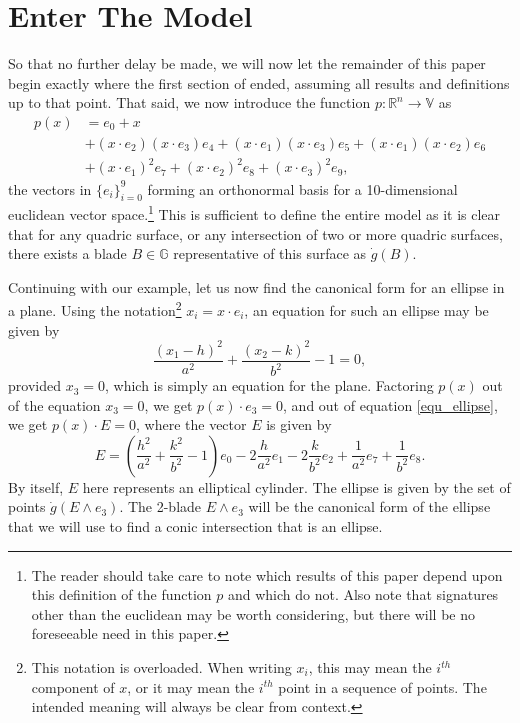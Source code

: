 \documentclass{birkjour}
\theoremstyle{definition}
\theoremstyle{remark}
\numberwithin{equation}{section}
\newcommand{\R}{\mathbb{R}}
\newcommand{\G}{\mathbb{G}}
\newcommand{\V}{\mathbb{V}}
\newcommand{\gd}{\dot{g}}
\begin{document}
\section{Enter The Model}

So that no further delay be made, we will now let the remainder of this paper begin
exactly where the first section of \cite{} ended, assuming all results and definitions up to that point.
That said, we now introduce the function $p:\R^n\to\V$ as
\begin{align*}
p(x) &= e_0 + x \\
 &+ (x\cdot e_2)(x\cdot e_3)e_4 + (x\cdot e_1)(x\cdot e_3)e_5 + (x\cdot e_1)(x\cdot e_2)e_6 \\
 &+ (x\cdot e_1)^2e_7 + (x\cdot e_2)^2e_8 + (x\cdot e_3)^2 e_9,
\end{align*}
the vectors in $\{e_i\}_{i=0}^9$ forming an orthonormal basis for a 10-dimensional
euclidean vector space.\footnote{The reader should take care to note which results of this paper
depend upon this definition of the function $p$ and which do not.  Also note that signatures
other than the euclidean may be worth considering, but there will be no foreseeable need in this paper.}
This is sufficient to define the entire model as it is clear that for any quadric
surface, or any intersection of two or more quadric surfaces, there exists a blade
$B\in\G$ representative of this surface as $\gd(B)$.

Continuing with our example, let us now find the canonical form for an ellipse
in a plane.  Using the notation\footnote{This notation is overloaded.  When writing $x_i$, this may mean
the $i^{th}$ component of $x$, or it may mean the $i^{th}$ point in a sequence of points.  The intended
meaning will always be clear from context.} $x_i = x\cdot e_i$, an equation for such an ellipse
may be given by
\begin{equation}\label{equ_ellipse}
\frac{(x_1-h)^2}{a^2} + \frac{(x_2-k)^2}{b^2} - 1 = 0,
\end{equation}
provided $x_3=0$, which is simply an equation for the plane.
Factoring $p(x)$ out of the equation $x_3=0$, we get $p(x)\cdot e_3=0$,
and out of equation \eqref{equ_ellipse}, we get $p(x)\cdot E=0$, where the
vector $E$ is given by
\begin{equation*}
E = \left(\frac{h^2}{a^2}+\frac{k^2}{b^2} - 1\right)e_0 -
  2\frac{h}{a^2}e_1 - 2\frac{k}{b^2}e_2 + \frac{1}{a^2}e_7 + \frac{1}{b^2}e_8.
\end{equation*}
By itself, $E$ here represents an elliptical cylinder.  The ellipse is given by
the set of points $\gd(E\wedge e_3)$.  The 2-blade $E\wedge e_3$ will be the
canonical form of the ellipse that we will use to find a conic intersection that
is an ellipse.
\end{document}
